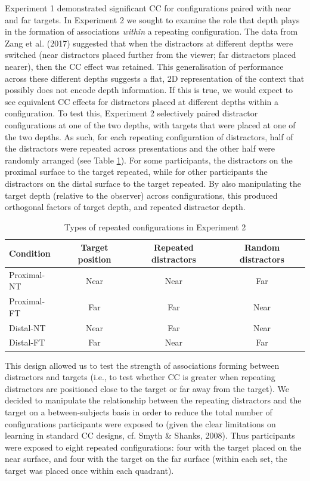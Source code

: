 \documentclass[
  man,floatsintext]{apa7}
\begin{document}
Experiment 1 demonstrated significant CC for configurations paired with near and far targets. In Experiment 2 we sought to examine the role that depth plays in the formation of associations \emph{within} a repeating configuration. The data from Zang et al. (2017) suggested that when the distractors at different depths were switched (near distractors placed further from the viewer; far distractors placed nearer), then the CC effect was retained. This generalisation of performance across these different depths suggests a flat, 2D representation of the context that possibly does not encode depth information. If this is true, we would expect to see equivalent CC effects for distractors placed at different depths within a configuration. To test this, Experiment 2 selectively paired distractor configurations at one of the two depths, with targets that were placed at one of the two depths. As such, for each repeating configuration of distractors, half of the distractors were repeated across presentations and the other half were randomly arranged (see Table \ref{tab:Exp-2-design}). For some participants, the distractors on the proximal surface to the target repeated, while for other participants the distractors on the distal surface to the target repeated. By also manipulating the target depth (relative to the observer) across configurations, this produced orthogonal factors of target depth, and repeated distractor depth.

\begin{table}

\caption{\label{tab:Exp-2-design}Types of repeated configurations in Experiment 2}
\centering
\begin{tabular}[t]{lccc}
\toprule
Condition & Target position & Repeated distractors & Random distractors\\
\midrule
Proximal-NT & Near & Near & Far\\
Proximal-FT & Far & Far & Near\\
Distal-NT & Near & Far & Near\\
Distal-FT & Far & Near & Far\\
\bottomrule
\end{tabular}
\end{table}

This design allowed us to test the strength of associations forming between distractors and targets (i.e., to test whether CC is greater when repeating distractors are positioned close to the target or far away from the target). We decided to manipulate the relationship between the repeating distractors and the target on a between-subjects basis in order to reduce the total number of configurations participants were exposed to (given the clear limitations on learning in standard CC designs, cf. Smyth \& Shanks, 2008). Thus participants were exposed to eight repeated configurations: four with the target placed on the near surface, and four with the target on the far surface (within each set, the target was placed once within each quadrant).
\end{document}
